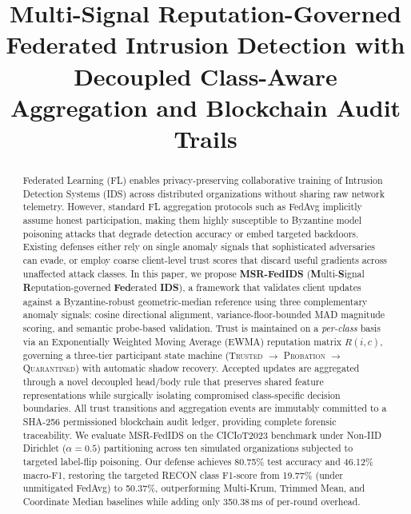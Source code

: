 \documentclass[conference]{IEEEtran}
\begin{document}
\title{Multi-Signal Reputation-Governed Federated Intrusion Detection with Decoupled Class-Aware Aggregation and Blockchain Audit Trails}

\author{
}

\maketitle

\begin{abstract}
Federated Learning (FL) enables privacy-preserving collaborative training of Intrusion Detection Systems (IDS) across distributed organizations without sharing raw network telemetry. However, standard FL aggregation protocols such as FedAvg implicitly assume honest participation, making them highly susceptible to Byzantine model poisoning attacks that degrade detection accuracy or embed targeted backdoors. Existing defenses either rely on single anomaly signals that sophisticated adversaries can evade, or employ coarse client-level trust scores that discard useful gradients across unaffected attack classes. In this paper, we propose \textbf{MSR-FedIDS} (\textbf{M}ulti-\textbf{S}ignal \textbf{R}eputation-governed \textbf{Fed}erated \textbf{IDS}), a framework that validates client updates against a Byzantine-robust geometric-median reference using three complementary anomaly signals: cosine directional alignment, variance-floor-bounded MAD magnitude scoring, and semantic probe-based validation. Trust is maintained on a \emph{per-class} basis via an Exponentially Weighted Moving Average (EWMA) reputation matrix $R(i,c)$, governing a three-tier participant state machine (\textsc{Trusted} $\to$ \textsc{Probation} $\to$ \textsc{Quarantined}) with automatic shadow recovery. Accepted updates are aggregated through a novel decoupled head/body rule that preserves shared feature representations while surgically isolating compromised class-specific decision boundaries. All trust transitions and aggregation events are immutably committed to a SHA-256 permissioned blockchain audit ledger, providing complete forensic traceability. We evaluate MSR-FedIDS on the CICIoT2023 benchmark under Non-IID Dirichlet ($\alpha = 0.5$) partitioning across ten simulated organizations subjected to targeted label-flip poisoning. Our defense achieves 80.75\% test accuracy and 46.12\% macro-F1, restoring the targeted RECON class F1-score from 19.77\% (under unmitigated FedAvg) to 50.37\%, outperforming Multi-Krum, Trimmed Mean, and Coordinate Median baselines while adding only 350.38\,ms of per-round overhead.
\end{abstract}
\end{document}
